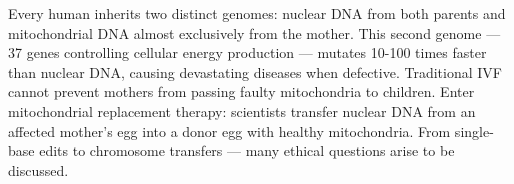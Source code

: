 Every human inherits two distinct genomes: nuclear DNA from both parents and mitochondrial DNA almost exclusively from the mother. This second genome — 37 genes controlling cellular energy production — mutates 10-100 times faster than nuclear DNA, causing devastating diseases when defective. Traditional IVF cannot prevent mothers from passing faulty mitochondria to children. Enter mitochondrial replacement therapy: scientists transfer nuclear DNA from an affected mother's egg into a donor egg with healthy mitochondria. From single-base edits to chromosome transfers — many ethical questions arise to be discussed.